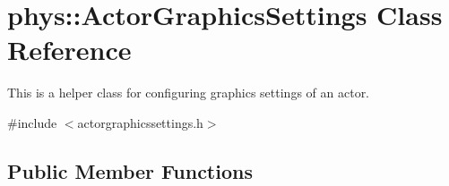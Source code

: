 \hypertarget{classphys_1_1ActorGraphicsSettings}{
\section{phys::ActorGraphicsSettings Class Reference}
\label{dd/dd6/classphys_1_1ActorGraphicsSettings}
}


This is a helper class for configuring graphics settings of an actor.  




{\ttfamily \#include $<$actorgraphicssettings.h$>$}

\subsection*{Public Member Functions}
